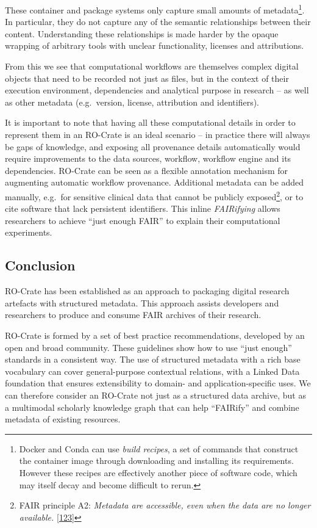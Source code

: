 These container and package systems only capture small amounts of
metadata\footnote{Docker and Conda can use \emph{build recipes}, a set
  of commands that construct the container image through downloading and
  installing its requirements. However these recipes are effectively
  another piece of software code, which may itself decay and become
  difficult to rerun.}. In particular, they do not capture any of the
semantic relationships between their content. Understanding these
relationships is made harder by the opaque wrapping of arbitrary tools
with unclear functionality, licenses and attributions.

From this we see that computational workflows are themselves complex
digital objects that need to be recorded not just as files, but in the
context of their execution environment, dependencies and analytical
purpose in research -- as well as other metadata (e.g.~version, license,
attribution and identifiers).

It is important to note that having all these computational details in
order to represent them in an RO-Crate is an ideal scenario -- in
practice there will always be gaps of knowledge, and exposing all
provenance details automatically would require improvements to the data
sources, workflow, workflow engine and its dependencies. RO-Crate can be
seen as a flexible annotation mechanism for augmenting automatic
workflow provenance. Additional metadata can be added manually, e.g.~for
sensitive clinical data that cannot be publicly exposed\footnote{FAIR
  principle A2: \emph{Metadata are accessible, even when the data are no
  longer available.}
  {[}\href{https://doi.org/10.1038/sdata.2016.18}{123}{]}}, or to cite
software that lack persistent identifiers. This inline \emph{FAIRifying}
allows researchers to achieve ``just enough FAIR'' to explain their
computational experiments.

\hypertarget{conclusion}{%
\subsection{Conclusion}\label{conclusion}}

RO-Crate has been established as an approach to packaging digital
research artefacts with structured metadata. This approach assists
developers and researchers to produce and consume FAIR archives of their
research.

RO-Crate is formed by a set of best practice recommendations, developed
by an open and broad community. These guidelines show how to use ``just
enough'' standards in a consistent way. The use of structured metadata
with a rich base vocabulary can cover general-purpose contextual
relations, with a Linked Data foundation that ensures extensibility to
domain- and application-specific uses. We can therefore consider an
RO-Crate not just as a structured data archive, but as a multimodal
scholarly knowledge graph that can help ``FAIRify'' and combine metadata
of existing resources.

